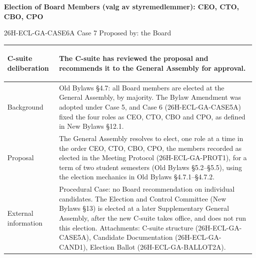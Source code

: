 \documentclass{../../../Common/Latex/Templates/rapport}
\begin{document}
\reportmainmatter
\small
\setlength{\parindent}{0pt}
\setlength{\tabcolsep}{6pt}
\renewcommand{\arraystretch}{1.2}

\begin{center}
  {\Large\bfseries Election of Board Members (valg av styremedlemmer): CEO, CTO, CBO, CPO}\par
  \vspace{0.15cm}
  {\normalsize 26H-ECL-GA-CASE6A \textperiodcentered{} Case 7 \textperiodcentered{} Proposed by: the Board}\par
  \vspace{0.1cm}
  {\small \meetingline}\par
\end{center}

\vspace{0.3cm}
\begin{tabularx}{\textwidth}{|>{\bfseries\raggedright\arraybackslash}p{4.2cm}|X|}
  \hline
  C-suite deliberation & The C-suite has reviewed the proposal and recommends it to the General Assembly for approval. \\
  \hline
  Background           & Old Bylaws \S4.7: all Board members are elected at the General Assembly, by majority. The Bylaw Amendment was adopted under Case 5, and Case 6 (26H-ECL-GA-CASE5A) fixed the four roles as CEO, CTO, CBO and CPO, as defined in New Bylaws \S12.1. \\
  \hline
  Proposal             & The General Assembly resolves to elect, one role at a time in the order CEO, CTO, CBO, CPO, the members recorded as elected in the Meeting Protocol (26H-ECL-GA-PROT1), for a term of two student semesters (Old Bylaws \S5.2--\S5.5), using the election mechanics in Old Bylaws \S4.7.1--\S4.7.2. \\
  \hline
  External information & Procedural Case: no Board recommendation on individual candidates. The Election and Control Committee (New Bylaws \S13) is elected at a later Supplementary General Assembly, after the new C-suite takes office, and does not run this election. Attachments: C-suite structure (26H-ECL-GA-CASE5A), Candidate Documentation (26H-ECL-GA-CAND1), Election Ballot (26H-ECL-GA-BALLOT2A). \\
  \hline
\end{tabularx}
\end{document}
